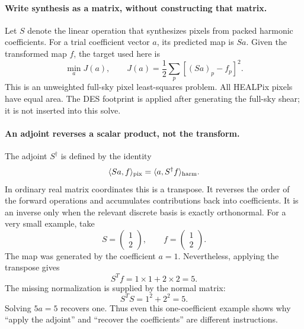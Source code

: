 \documentclass[11pt]{article}
\begin{document}
\paragraph{Write synthesis as a matrix, without constructing that matrix.}
Let $S$ denote the linear operation that synthesizes pixels from packed
harmonic coefficients. For a trial coefficient vector $a$, its predicted
map is $Sa$. Given the transformed map $f$, the target used here is
\begin{equation}
 \min_a J(a),\qquad J(a)=\frac12\sum_p[(Sa)_p-f_p]^2.
\end{equation}
This is an unweighted full-sky pixel least-squares problem. All HEALPix
pixels have equal area. The DES footprint is applied after generating the
full-sky shear; it is not inserted into this solve.

\paragraph{An adjoint reverses a scalar product, not the transform.}
The adjoint $S^\dagger$ is defined by the identity
\begin{equation}
 \langle Sa,f\rangle_{\rm pix}=\langle a,S^\dagger f\rangle_{\rm harm}.
\end{equation}
In ordinary real matrix coordinates this is a transpose. It reverses the
order of the forward operations and accumulates contributions back into
coefficients. It is an inverse only when the relevant discrete basis is
exactly orthonormal. For a very small example, take
\begin{equation}
 S=\begin{pmatrix}1\\2\end{pmatrix},\qquad
 f=\begin{pmatrix}1\\2\end{pmatrix}.
\end{equation}
The map was generated by the coefficient $a=1$. Nevertheless, applying the
transpose gives
\begin{equation}
 S^T f=1\times1+2\times2=5.
\end{equation}
The missing normalization is supplied by the normal matrix:
\begin{equation}
 S^TS=1^2+2^2=5.
\end{equation}
Solving $5a=5$ recovers one. Thus even this one-coefficient example shows
why ``apply the adjoint'' and ``recover the coefficients'' are different
instructions.
\end{document}
